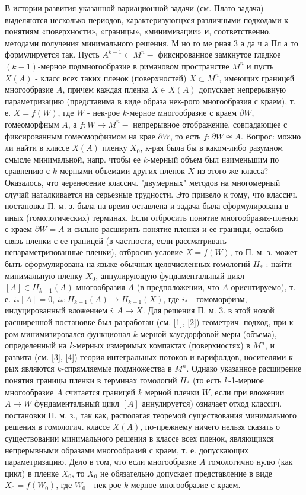 \documentclass[10pt]{article}
\begin{document}
В истории развития указанной вариационной задачи (см. Плато задача) выделяются несколько периодов, характеризуюгцхся различными подходами к понятиям «поверхности», «границы», «минимизации» и, соответственно, методами получения минимального решения. М но го ме рная 3 а да ч а Пл а то формулируется так. Пусть $A^{k-1} \subset M^{n}-$ фиксированное замкнутое гладкое $(k-1)$-мерное подмногообразие в римановом пространстве $M^{n}$ и пусть $X(A)$ - класс всех таких пленок (поверхностей) $X \subset M^{n}$, имеющих границей многообразие $A$, причем каждая пленка $X \in X(A)$ допускает непрерывную параметризацию (представима в виде образа нек-рого многообразия с краем), т. е. $X=f(W)$, где $W$ - нек-рое $k$-мерное многообразие с краем $\partial W$, гомеоморфным $A$, а $f: W \rightarrow M^{n}-$ непрерывное отображение, совпадающее с фиксированным гомеоморфизмом на крае $\partial W$, то есть $f: \partial W \cong A$. Вопрос: можно ли найти в классе $X(A)$ пленку $X_{0}$, к-рая была бы в каком-либо разумном смысле минимальной, напр. чтобы ее $k$-мерный объем был наименьшим по сравнению с $k$-мерными объемами других пленок $X$ из этого же класса? Оказалось, что черенөсение классич. "двумерных" методов на многомерный случай наталкивается на серьезные трудности. Это привело к тому, что классич. постановка П. м. з. была на время оставлена и задача была сформулирована в иных (гомологических) терминах. Если отбросить понятие многообразия-пленки с краем $\partial W=A$ и сильно расширить понятие пленки и ее границы, ослабив связь пленки с ее границей (в частности, если рассматривать непараметризованные пленки), отбросив условие $X=f(W)$, то П. м. з. может быть сформулирована на языке обычных целочисленных гомологий $H_{*}$ : найти минимальную пленку $X_{0}$, аннулирующую фундаментальный цикл $[A] \in H_{k-1}(A)$ многообразия $A$ (в предположении, что $A$ ориентируемо), т. е. $i_{*}[A]=0$, $i_{*}: H_{k-1}(A) \rightarrow H_{k-1}(X)$, где $i_{*}$ - гомоморфизм, индуцированный вложением $i: A \rightarrow X$. Для решения П. м. 3. в этой новой расширенной постановке был разработан (см. [1], [2]) геометрич. подход, при к-ром минимизировался функционал $k$-мерной хаусдорфовой меры (объема), определенный на $k$-мерных измеримых компактах (поверхностях) в $M^{n}$, и развита (см. [3], [4]) теория интегральных потоков и варифолдов, носителями к-рых являются $k$-спрямляемые подмножества в $M^{n}$. Однако указанное расширение понятия границы пленки в терминах гомологий $H_{*}$ (то есть $k$-1-мерное многообразие $A$ считается границей $k$ мерной пленки $W$, если при вложении $A \rightarrow W$ фундаментальный цикл $[A]$ аннулируется) означает отход классич. постановки П. м. з., так как, располагая теоремой существования минимального решения в гомологич. классе $X(A)$, по-прежнему ничего нельзя сказать о существовании минимального решения в классе всех пленок, являющихся непрерывными образами многообразий с краем, т. е. допускающих параметризацию. Дело в том, что если многообразие $A$ гомологично нулю (как цикл) в пленке $X_{0}$, то $X_{0}$ не обязательно допускает представление в виде $X_{0}=f\left(W_{0}\right)$, где $W_{0}$ - нек-рое $k$-мерное многообразие с краем.
\end{document}
